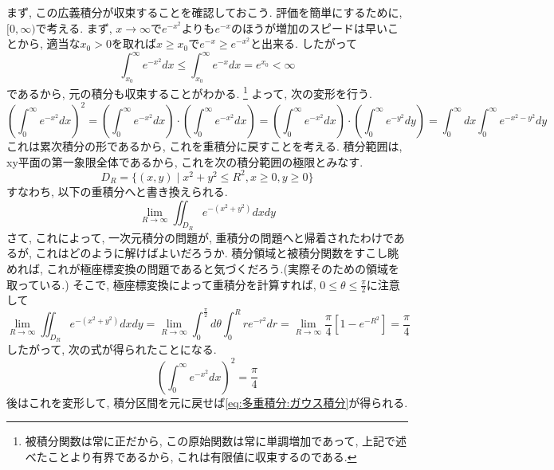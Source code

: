         まず, この広義積分が収束することを確認しておこう. 評価を簡単にするために, $[0,\infty)$で考える. まず, $x\to\infty$で$e^{-x^2}$よりも$e^{-x}$のほうが増加のスピードは早いことから,
        適当な$x_0>0$を取れば$x\geq x_0$で$e^{-x}\geq e^{-x^2}$と出来る. したがって
        \begin{equation*}
            \int_{x_0}^{\infty}e^{-x^2}dx\leq \int_{x_0}^{\infty}e^{-x}dx = e^{x_0} < \infty
        \end{equation*}
        であるから, 元の積分も収束することがわかる. \footnote{被積分関数は常に正だから, この原始関数は常に単調増加であって, 上記で述べたことより有界であるから, これは有限値に収束するのである.}
        よって, 次の変形を行う.
        \begin{equation*}
            \left(\int_{0}^{\infty}e^{-x^2}dx\right)^2 = \left(\int_{0}^{\infty}e^{-x^2}dx\right)\cdot \left(\int_{0}^{\infty}e^{-x^2}dx\right)=\left(\int_{0}^{\infty}e^{-x^2}dx\right)\cdot \left(\int_{0}^{\infty}e^{-y^2}dy\right)=\int_0^\infty dx\int_0^\infty e^{-x^2-y^2}dy
        \end{equation*}
        これは累次積分の形であるから, これを重積分に戻すことを考える. 積分範囲は, xy平面の第一象限全体であるから, これを次の積分範囲の極限とみなす.
        \begin{equation*}
            D_R = \{(x,y)\mid x^2+y^2\leq R^2,x\geq 0,y\geq 0\}
        \end{equation*}
        すなわち, 以下の重積分へと書き換えられる.
        \begin{equation*}
            \lim_{R\to\infty}\iint_{D_R} e^{-(x^2+y^2)}dxdy
        \end{equation*}
        さて, これによって, 一次元積分の問題が, 重積分の問題へと帰着されたわけであるが, これはどのように解けばよいだろうか. 
        積分領域と被積分関数をすこし眺めれば, これが極座標変換の問題であると気づくだろう.(実際そのための領域を取っている.)
        そこで, 極座標変換によって重積分を計算すれば, $0\leq\theta\leq\frac{\pi}{2}$に注意して
        \begin{equation*}
            \lim_{R\to\infty}\iint_{D_R} e^{-(x^2+y^2)}dxdy = \lim_{R\to\infty}\int_{0}^{\frac{\pi}{2}}d\theta\int_{0}^{R}re^{-r^2}dr=\lim_{R\to\infty}\frac{\pi}{4}\left[1-e^{-R^2}\right]=\frac{\pi}{4}
        \end{equation*}
        \clearpage
        したがって, 次の式が得られたことになる.
        \begin{equation*}
            \left(\int_{0}^{\infty}e^{-x^2}dx\right)^2 = \frac{\pi}{4}
        \end{equation*}
        後はこれを変形して, 積分区間を元に戻せば\eqref{eq:多重積分:ガウス積分}が得られる.\\

